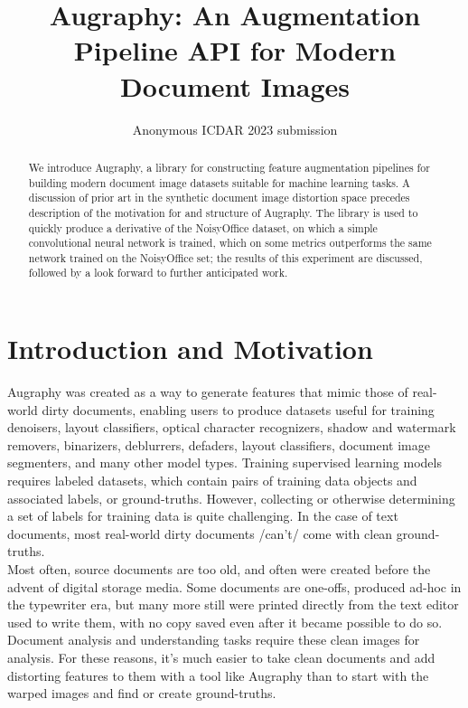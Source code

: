\documentclass[runningheads]{llncs}
\begin{document}
\title{Augraphy: An Augmentation Pipeline API for Modern Document Images}
%
%

\author{Anonymous ICDAR 2023 submission}

\maketitle

\begin{abstract}
We introduce Augraphy, a library for constructing feature augmentation pipelines for building modern document image datasets suitable for machine learning tasks. A discussion of prior art in the synthetic document image distortion space precedes description of the motivation for and structure of Augraphy. The library is used to quickly produce a derivative of the NoisyOffice dataset, on which a simple convolutional neural network is trained, which on some metrics outperforms the same network trained on the NoisyOffice set; the results of this experiment are discussed, followed by a look forward to further anticipated work.
\end{abstract}

\section{Introduction and Motivation}
Augraphy was created as a way to generate features that mimic those of real-world dirty documents, enabling users to produce datasets useful for training denoisers, layout classifiers, optical character recognizers, shadow and watermark removers, binarizers, deblurrers, defaders, layout classifiers, document image segmenters, and many other model types. Training supervised learning models requires labeled datasets, which contain pairs of training data objects and associated labels, or ground-truths. However, collecting or otherwise determining a set of labels for training data is quite challenging.  In the case of text documents, most real-world dirty documents /can't/ come with clean ground-truths.\\

Most often, source documents are too old, and often were created before the advent of digital storage media. Some documents are one-offs, produced ad-hoc in the typewriter era, but many more still were printed directly from the text editor used to write them, with no copy saved even after it became possible to do so. Document analysis and understanding tasks require these clean images for analysis. For these reasons, it's much easier to take clean documents and add distorting features to them with a tool like Augraphy than to start with the warped images and find or create ground-truths.
\end{document}
